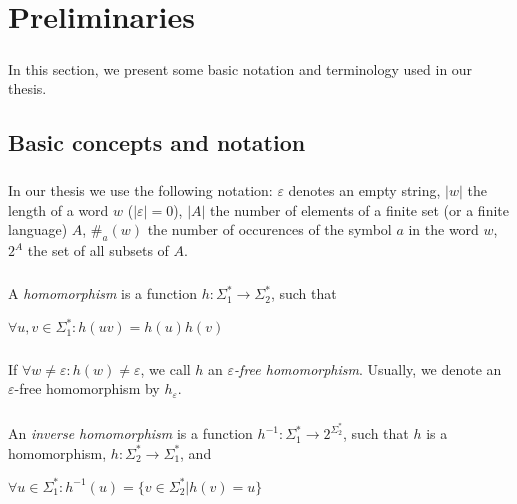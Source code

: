 \chapter{Preliminaries}
\label{chap:Preliminaries}

\paragraph{}
In this section, we present some basic notation and terminology used in our thesis.

\section{Basic concepts and notation}

\paragraph{}
\oznacenie In our thesis we use the following notation: $\varepsilon $ denotes an empty string, $|w|$ the length of a word $w$ ($|\varepsilon |=0$), $|A|$ the number of elements of a finite set (or a finite language) $A$, $\# _{a}(w)$ the number of occurences of the symbol $a$ in the word $w$, $2^{A}$ the set of all subsets of $A$.

\paragraph{}
 A \emph{homomorphism} is a function $h: \Sigma_{1}^{*} \rightarrow \Sigma_{2}^{*}$, such that \\	
\centerline{$\forall u, v \in \Sigma_1^*: h(uv) = h(u)h(v)$}

\paragraph{}
\oznacenie If $\forall w \neq \varepsilon : h(w) \neq \varepsilon $, we call $h$ an \emph{$\varepsilon $-free homomorphism}. Usually, we denote an $\varepsilon $-free homomorphism by $h_{\varepsilon }$.

\paragraph{}
 An \emph{inverse homomorphism} is a function $h^{-1}: \Sigma_{1}^{*} \rightarrow 2^{\Sigma_{2}^{*}}$, such that $h$ is a homomorphism, $h: \Sigma_2^* \rightarrow \Sigma_1^*$, and \\
\centerline{$\forall u \in \Sigma_1^*: h^{-1}(u) = \{ v \in \Sigma_2^* | h(v) = u \} $}

